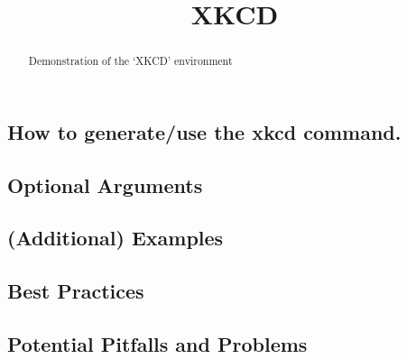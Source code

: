 \documentclass{ximera}
\title{XKCD}
\begin{document}
\begin{abstract}
    Demonstration of the `XKCD' environment
\end{abstract}
\maketitle


    \subsection*{How to generate/use the xkcd command.}
        
        
        
    \subsection*{Optional Arguments}
    
        
        
    \subsection*{(Additional) Examples}
        
        
        
    \subsection*{Best Practices}
    
        
        
    \subsection*{Potential Pitfalls and Problems}   
        
        
        
        
\end{document}
